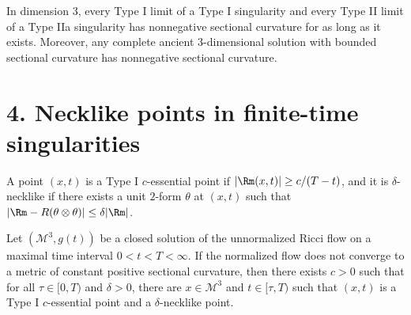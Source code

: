 \begin{corollary}
\label{ch09-cor-nonnegative-curvature-limits}

In dimension \(3\), every Type I limit of a Type I singularity and every Type II limit of a Type IIa singularity has nonnegative sectional curvature for as long as it exists. Moreover, any complete ancient \(3\)-dimensional solution with bounded sectional curvature has nonnegative sectional curvature.
\end{corollary}

\section*{4. Necklike points in finite-time singularities}

\begin{definition}
\label{ch09-def-type-i-essential-necklike}

A point \((x,t)\) is a Type I \(c\)-essential point if \(|\Rm(x,t)|\ge c/(T-t)\), and it is \(\delta\)-necklike if there exists a unit \(2\)-form \(\theta\) at \((x,t)\) such that \(|\Rm-R(\theta\otimes\theta)|\le \delta|\Rm|\).
\end{definition}

\begin{theorem}
\label{ch09-thm-necklike-points-finite-time}

Let \((\mathcal M^3,g(t))\) be a closed solution of the unnormalized Ricci flow on a maximal time interval \(0<t<T<\infty\). If the normalized flow does not converge to a metric of constant positive sectional curvature, then there exists \(c>0\) such that for all \(\tau\in[0,T)\) and \(\delta>0\), there are \(x\in\mathcal M^3\) and \(t\in[\tau,T)\) such that \((x,t)\) is a Type I \(c\)-essential point and a \(\delta\)-necklike point.
\end{theorem}

